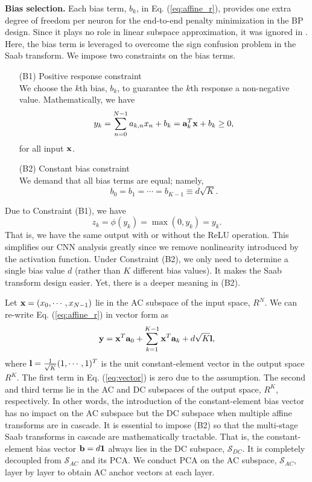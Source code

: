 \documentclass[preprint,12pt]{elsarticle}
\begin{document}
{\bf Bias selection.} Each bias term, $b_k$, in Eq.
(\ref{eq:affine_r}), provides one extra degree of freedom per neuron for
the end-to-end penalty minimization in the BP design. Since it plays no
role in linear subspace approximation, it was ignored in
\cite{kuo2016understanding, kuo2017cnn, kuo2018data}.  Here, the bias
term is leveraged to overcome the sign confusion problem in the Saab
transform. We impose two constraints on the bias terms. 
\begin{itemize}
\item[(B1)] Positive response constraint \\
We choose the $k$th bias, $b_k$, to guarantee the $k$th response a 
non-negative value. Mathematically, we have
\begin{equation}\label{eq:affine2}
y_k=\sum_{n=0}^{N-1}a_{k,n}x_n+b_k={\bf a}_k^T {\bf x}+b_k \ge 0,
\end{equation}
for all input ${\bf x}$.
\item[(B2)] Constant bias constraint \\
We demand that all bias terms are equal; namely,
\begin{equation}\label{eq:b_constant}
b_0=b_1= \cdots = b_{K-1} \equiv d \sqrt{K}. 
\end{equation}
\end{itemize}

Due to Constraint (B1), we have
\begin{equation}\label{eq:na2}
z_k= \phi (y_k) = \max (0, y_k) = y_k.
\end{equation}
That is, we have the same output with or without the ReLU operation.
This simplifies our CNN analysis greatly since we remove nonlinearity
introduced by the activation function. Under Constraint (B2), we only
need to determine a single bias value $d$ (rather than $K$ different
bias values). It makes the Saab transform design easier. Yet, there is a
deeper meaning in (B2). 

Let ${\bf x}=(x_0, \cdots, x_{N-1})$ lie in the AC subspace of the input 
space, $R^N$. We can re-write Eq.  (\ref{eq:affine_r}) in vector form as
\begin{equation}\label{eq:vector}
{\bf y} = {\bf x}^T {\bf a}_0 + \sum_{k=1}^{K-1} {\bf x}^T {\bf a}_k +  
d \sqrt{K} {\bf l}, 
\end{equation}
where ${\bf l}=\frac{1}{\sqrt{K}}(1, \cdots, 1)^T$ is the unit
constant-element vector in the output space $R^K$. The first term in Eq.
(\ref{eq:vector}) is zero due to the assumption. The second and third
terms lie in the AC and DC subspaces of the output space, $R^K$,
respectively.  In other words, the introduction of the constant-element
bias vector has no impact on the AC subspace but the DC subspace when
multiple affine transforms are in cascade.  It is essential to impose
(B2) so that the multi-stage Saab transforms in cascade are
mathematically tractable. That is, the constant-element bias vector
${\bf b}=d {\bf 1}$ always lies in the DC subspace, $\mathcal{S}_{DC}$.
It is completely decoupled from $\mathcal{S}_{AC}$ and its PCA.  We
conduct PCA on the AC subspace, $\mathcal{S}_{AC}$, layer by layer to
obtain AC anchor vectors at each layer. 
\end{document}
